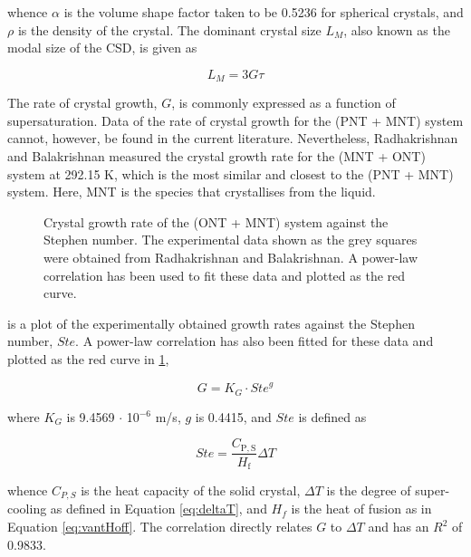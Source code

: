 \noindent whence $\alpha$ is the volume shape factor taken to be 0.5236 for spherical crystals, and $\rho$ is the density of the crystal. The dominant crystal size $L_M$, also known as the modal size of the CSD, is given as 

\begin{equation} \label{eq:LM G tau}
    L_M = 3 G \tau
\end{equation}

The rate of crystal growth, $G$, is commonly expressed as a function of supersaturation. Data of the rate of crystal growth for the (PNT + MNT) system cannot, however, be found in the current literature. Nevertheless, Radhakrishnan and Balakrishnan measured the crystal growth rate for the (MNT + ONT) system at 292.15 K, which is the most similar and closest to the (PNT + MNT) system. \cite{radhakrishnan_kinetics_1999} Here, MNT is the species that crystallises from the liquid.

\begin{figure}[h]
    \centering
    
    \caption{Crystal growth rate of the (ONT + MNT) system against the Stephen number. The experimental data shown as the grey squares were obtained from Radhakrishnan and Balakrishnan. \cite{radhakrishnan_kinetics_1999} A power-law correlation has been used to fit these data and plotted as the red curve.}
    \label{fig:ONT + MNT kinetics}
\end{figure}

 is a plot of the experimentally obtained growth rates against the Stephen number, $Ste$. A power-law correlation has also been fitted for these data and plotted as the red curve in \cref{fig:ONT + MNT kinetics},

\begin{equation}  \label{eq:KG Ste g}
    G = K_G \cdot {Ste}^{g}
\end{equation}

\noindent where $K_G$ is 9.4569 $\cdot$ 10$^{-6}$ m/s, $g$ is 0.4415, and $Ste$ is defined as 

\begin{equation}
    Ste = \frac{C_{\mathrm{P,S}}}{H_{\mathrm{f}}} \Delta T
\end{equation}

\noindent whence $C_{P,S}$ is the heat capacity of the solid crystal, $\Delta T$ is the degree of super-cooling as defined in Equation \ref{eq:deltaT}, and $H_{f}$ is the heat of fusion as in Equation \ref{eq:vantHoff}. The correlation directly relates $G$ to $\Delta T$ and has an $R^2$ of 0.9833.

